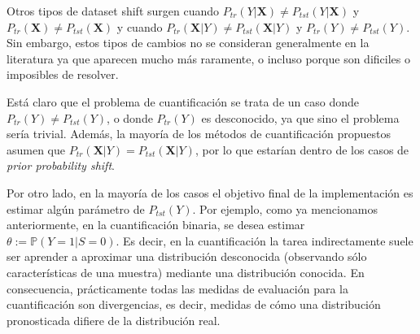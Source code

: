 Otros tipos de dataset shift surgen cuando $P_{tr}(Y|\mathbf{X}) \neq
P_{tst}(Y|\mathbf{X})$ y $P_{tr}(\mathbf{X}) \neq P_{tst}(\mathbf{X})$ y cuando
$P_{tr}(\mathbf{X}|Y) \neq P_{tst}(\mathbf{X}|Y)$ y $P_{tr}(Y) \neq P_{tst}(Y)$.
Sin embargo, estos tipos de cambios no se consideran generalmente en la
literatura ya que aparecen mucho más raramente, o incluso porque son dificiles o
imposibles de resolver.

Está claro que el problema de cuantificación se trata de un caso donde
$P_{tr}(Y) \neq P_{tst}(Y)$, o donde $P_{tr}(Y)$ es desconocido, ya que sino el
problema sería trivial. Además, la mayoría de los métodos de cuantificación
propuestos asumen que $P_{tr}(\mathbf{X}|Y) = P_{tst}(\mathbf{X}|Y)$, por lo que
estarían dentro de los casos de {\it prior probability shift}.

Por otro lado, en la mayoría de los casos el objetivo final de la implementación
es estimar algún parámetro de $P_{tst}(Y)$. Por ejemplo, como ya mencionamos
anteriormente, en la cuantificación binaria, se desea estimar $\theta:=
\mathbb{P}(Y=1|S=0)$. Es decir, en la cuantificación la tarea indirectamente
suele ser aprender a aproximar una distribución desconocida (observando sólo
características de una muestra) mediante una distribución conocida. En
consecuencia, prácticamente todas las medidas de evaluación para la
cuantificación son divergencias, es decir, medidas de cómo una distribución
pronosticada difiere de la distribución real.


